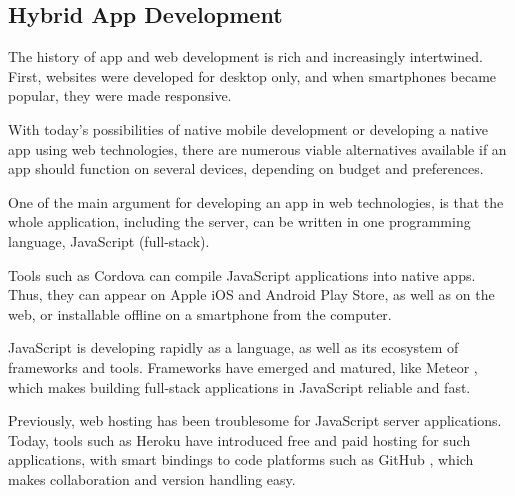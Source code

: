 \subsection{Hybrid App Development}

The history of app and web development is rich and increasingly intertwined. First, websites were developed for desktop only, and when smartphones became popular, they were made responsive.

With today's possibilities of native mobile development or developing a native app using web technologies, there are numerous viable alternatives available if an app should function on several devices, depending on budget and preferences.

One of the main argument for developing an app in web technologies, is that the whole application, including the server, can be written in one programming language, JavaScript (full-stack).

Tools such as Cordova \citep*{cordova} can compile JavaScript applications into native apps. Thus, they can appear on Apple iOS and Android Play Store, as well as on the web, or installable offline on a smartphone from the computer.

JavaScript is developing rapidly as a language, as well as its ecosystem of frameworks and tools. Frameworks have emerged and matured, like Meteor \citep*{meteor}, which makes building full-stack applications in JavaScript reliable and fast.

Previously, web hosting has been troublesome for JavaScript server applications. Today, tools such as Heroku \citep*{heroku} have introduced free and paid hosting for such applications, with smart bindings to code platforms such as GitHub \citep*{github}, which makes collaboration and version handling easy.
